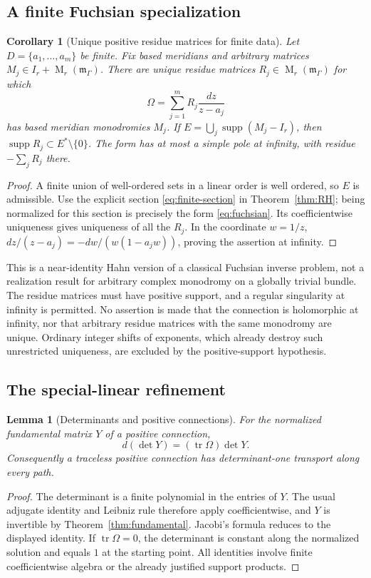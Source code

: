 \documentclass[11pt,letterpaper]{article}
\numberwithin{equation}{section}
\newtheorem{lemma}[theorem]{Lemma}
\newtheorem{corollary}[theorem]{Corollary}
\theoremstyle{definition}
\theoremstyle{remark}
\newcommand{\mm}{\mathfrak m}
\newcommand{\supp}{\operatorname{supp}}
\newcommand{\tr}{\operatorname{tr}}
\newcommand{\Mat}{\operatorname{M}}
\begin{document}
\subsection{A finite Fuchsian specialization}
\begin{corollary}[Unique positive residue matrices for finite data]
\label{cor:finite}
Let $D=\{a_1,\ldots,a_m\}$ be finite. Fix based meridians and arbitrary
matrices $M_j\in I_r+\Mat_r(\mm_\Gamma)$. There are unique residue matrices
$R_j\in\Mat_r(\mm_\Gamma)$ for which
\begin{equation}\label{eq:fuchsian}
 \Omega=\sum_{j=1}^m R_j\frac{dz}{z-a_j}
\end{equation}
has based meridian monodromies $M_j$. If
$E=\bigcup_j\supp(M_j-I_r)$, then $\supp R_j\subset E^*\setminus\{0\}$.
The form has at most a simple pole at infinity, with residue
$-\sum_jR_j$ there.
\end{corollary}
\begin{proof}
A finite union of well-ordered sets in a linear order is well ordered, so
$E$ is admissible. Use the explicit section \eqref{eq:finite-section} in
Theorem~\ref{thm:RH}; being normalized for this section is precisely the
form \eqref{eq:fuchsian}. Its coefficientwise uniqueness gives uniqueness
of all the $R_j$. In the coordinate $w=1/z$,
$dz/(z-a_j)=-dw/(w(1-a_jw))$, proving the assertion at infinity.
\end{proof}

This is a near-identity Hahn version of a classical Fuchsian inverse problem,
not a realization result for arbitrary complex monodromy on a globally
trivial bundle. The residue matrices must have positive support, and a
regular singularity at infinity is permitted. No assertion is made that the
connection is holomorphic at infinity, nor that arbitrary residue matrices
with the same monodromy are unique. Ordinary integer shifts of exponents,
which already destroy such unrestricted uniqueness, are excluded by the
positive-support hypothesis.

\subsection{The special-linear refinement}\label{sec:sl}

\begin{lemma}[Determinants and positive connections]\label{lem:det}
For the normalized fundamental matrix $Y$ of a positive connection,
\[
 d(\det Y)=(\tr\Omega)\det Y.
\]
Consequently a traceless positive connection has determinant-one transport
along every path.
\end{lemma}
\begin{proof}
The determinant is a finite polynomial in the entries of $Y$.
The usual adjugate identity and Leibniz rule therefore apply coefficientwise,
and $Y$ is invertible by Theorem~\ref{thm:fundamental}. Jacobi's formula
reduces to the displayed identity. If $\tr\Omega=0$, the determinant is
constant along the normalized solution and equals $1$ at the starting
point. All identities involve finite coefficientwise algebra or the already
justified support products.
\end{proof}
\end{document}
